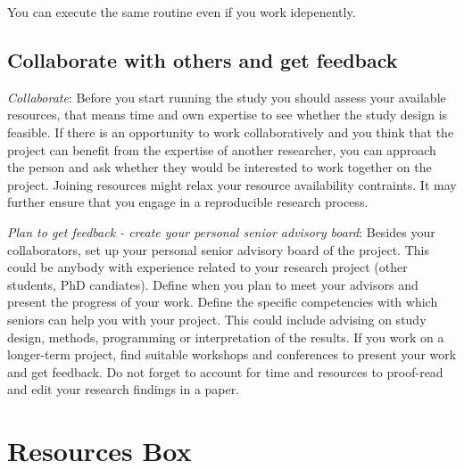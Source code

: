 \documentclass[
]{book}
\begin{document}
You can execute the same routine even if you work idepenently.

\hypertarget{collaborate-with-others-and-get-feedback}{%
\subsection{Collaborate with others and get
feedback}\label{collaborate-with-others-and-get-feedback}}

\emph{Collaborate}: Before you start running the study you should assess
your available resources, that means time and own expertise to see
whether the study design is feasible. If there is an opportunity to work
collaboratively and you think that the project can benefit from the
expertise of another researcher, you can approach the person and ask
whether they would be interested to work together on the project.
Joining resources might relax your resource availability contraints. It
may further ensure that you engage in a reproducible research process.

\emph{Plan to get feedback - create your personal senior advisory
board}: Besides your collaborators, set up your personal senior advisory
board of the project. This could be anybody with experience related to
your research project (other students, PhD candiates). Define when you
plan to meet your advisors and present the progress of your work. Define
the specific competencies with which seniors can help you with your
project. This could include advising on study design, methods,
programming or interpretation of the results. If you work on a
longer-term project, find suitable workshops and conferences to present
your work and get feedback. Do not forget to account for time and
resources to proof-read and edit your research findings in a paper.

\hypertarget{resources-box}{%
\section{Resources Box}\label{resources-box}}
\end{document}
